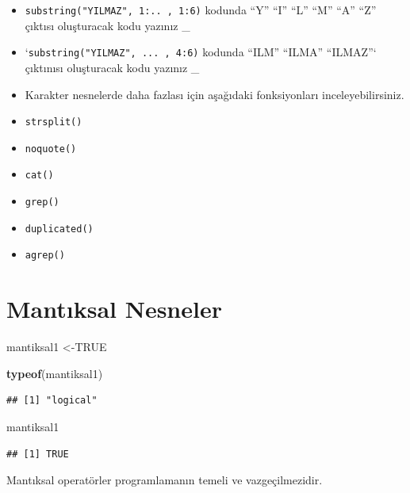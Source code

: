 \documentclass[
  oneside]{book}
\newenvironment{Shaded}{\begin{snugshade}}{\end{snugshade}}
\newcommand{\ConstantTok}[1]{\textcolor[rgb]{0.56,0.35,0.01}{#1}}
\newcommand{\FunctionTok}[1]{\textcolor[rgb]{0.13,0.29,0.53}{\textbf{#1}}}
\newcommand{\NormalTok}[1]{#1}
\newcommand{\OtherTok}[1]{\textcolor[rgb]{0.56,0.35,0.01}{#1}}
\begin{document}
\begin{itemize}
\item
  \texttt{substring("YILMAZ",\ 1:..\ ,\ 1:6)} kodunda ``Y'' ``I'' ``L'' ``M'' ``A'' ``Z'' çıktısı oluşturacak kodu yazınız \_
\item
  `\texttt{substring("YILMAZ",\ ...\ ,\ 4:6)} kodunda ``ILM'' ``ILMA'' ``ILMAZ''` çıktınısı oluşturacak kodu yazınız \_
\item
  Karakter nesnelerde daha fazlası için aşağıdaki fonksiyonları inceleyebilirsiniz.
\item
  \texttt{strsplit()}
\item
  \texttt{noquote()}
\item
  \texttt{cat()}
\item
  \texttt{grep()}
\item
  \texttt{duplicated()}
\item
  \texttt{agrep()}
\end{itemize}

\hypertarget{mantux131ksal-nesneler}{%
\section{Mantıksal Nesneler}\label{mantux131ksal-nesneler}}

\begin{Shaded}
\begin{Highlighting}[]
\NormalTok{mantiksal1 }\OtherTok{\textless{}{-}}\ConstantTok{TRUE}
\end{Highlighting}
\end{Shaded}

\begin{Shaded}
\begin{Highlighting}[]
\FunctionTok{typeof}\NormalTok{(mantiksal1)}
\end{Highlighting}
\end{Shaded}

\begin{verbatim}
## [1] "logical"
\end{verbatim}

\begin{Shaded}
\begin{Highlighting}[]
\NormalTok{mantiksal1}
\end{Highlighting}
\end{Shaded}

\begin{verbatim}
## [1] TRUE
\end{verbatim}

Mantıksal operatörler programlamanın temeli ve vazgeçilmezidir.
\end{document}
